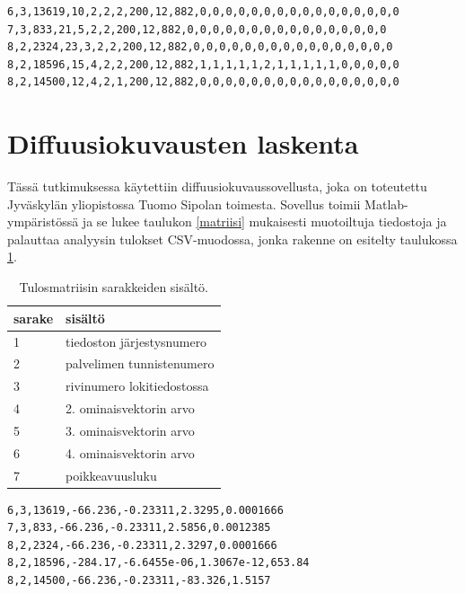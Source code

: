\begin{lstlisting}[float=h,label=csv882,aboveskip=0.5cm,caption=Esikäsiteltyä
  dataa CSV-muodossa esitettynä.]
6,3,13619,10,2,2,2,200,12,882,0,0,0,0,0,0,0,0,0,0,0,0,0,0,0,0
7,3,833,21,5,2,2,200,12,882,0,0,0,0,0,0,0,0,0,0,0,0,0,0,0,0
8,2,2324,23,3,2,2,200,12,882,0,0,0,0,0,0,0,0,0,0,0,0,0,0,0,0
8,2,18596,15,4,2,2,200,12,882,1,1,1,1,1,2,1,1,1,1,1,0,0,0,0,0
8,2,14500,12,4,2,1,200,12,882,0,0,0,0,0,0,0,0,0,0,0,0,0,0,0,0
\end{lstlisting}

\pagebreak

\section{Diffuusiokuvausten laskenta}
\label{sec:matlab}

Tässä tutkimuksessa käytettiin diffuusiokuvaussovellusta, joka on
toteutettu Jyväskylän yliopistossa Tuomo Sipolan toimesta. Sovellus
toimii Matlab-ympäristössä ja se lukee taulukon \ref{matriisi} mukaisesti
muotoiltuja tiedostoja ja palauttaa analyysin tulokset CSV-muodossa,
jonka rakenne on esitelty taulukossa \ref{zipolafile}.


\begin{table}[h]
\centering
\begin{tabular}{l|l}
sarake & sisältö \\
\hline
1 & tiedoston järjestysnumero \\
2 & palvelimen tunnistenumero \\
3 & rivinumero lokitiedostossa \\
4 & 2. ominaisvektorin arvo \\
5 & 3. ominaisvektorin arvo \\
6 & 4. ominaisvektorin arvo \\
7 & poikkeavuusluku \\

\end{tabular}
\caption{Tulosmatriisin sarakkeiden sisältö.}
\label{zipolafile}
\end{table}

\begin{lstlisting}[float=h,label=coords882,aboveskip=0.5cm,caption=Analysoitua
 dataa CSV-muodossa esitettynä.]
6,3,13619,-66.236,-0.23311,2.3295,0.0001666
7,3,833,-66.236,-0.23311,2.5856,0.0012385
8,2,2324,-66.236,-0.23311,2.3297,0.0001666
8,2,18596,-284.17,-6.6455e-06,1.3067e-12,653.84
8,2,14500,-66.236,-0.23311,-83.326,1.5157
\end{lstlisting}

